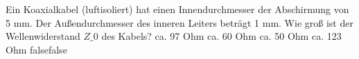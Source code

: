     {Ein Koaxialkabel (luftisoliert) hat einen Innendurchmesser der Abschirmung von 5 mm. Der Außendurchmesser des inneren Leiters beträgt 1 mm. Wie groß ist der Wellenwiderstand $Z\_0$ des Kabels?}
    {ca. 97 Ohm}
    {ca. 60 Ohm}
    {ca. 50 Ohm}
    {ca. 123 Ohm}
    {false}{false}